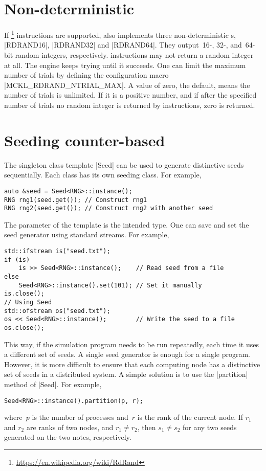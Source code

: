 \section{Non-deterministic \texorpdfstring{\rng}{RNG}}
\label{sec:Non-deterministic RNG}

If \rdrand\footnote{\url{https://en.wikipedia.org/wiki/RdRand}} instructions
are supported, \mckl also implements three non-deterministic \rng{}s,
|RDRAND16|, |RDRAND32| and |RDRAND64|. They output~16-, 32-, and~64-bit random
integers, respectively. \rdrand instructions may not return a random integer at
all. The \rng engine keeps trying until it succeeds. One can limit the maximum
number of trials by defining the configuration macro |MCKL_RDRAND_NTRIAL_MAX|.
A value of zero, the default, means the number of trials is unlimited. If it is
a positive number, and if after the specified number of trials no random
integer is returned by \rdrand instructions, zero is returned.

\section{Seeding counter-based \texorpdfstring{\rng}{RNG}}
\label{sec:Seeding counter-based RNG}

The singleton class template |Seed| can be used to generate distinctive seeds
sequentially. Each \rng class has its own seeding class. For example,
\begin{verbatim}
auto &seed = Seed<RNG>::instance();
RNG rng1(seed.get()); // Construct rng1
RNG rng2(seed.get()); // Construct rng2 with another seed
\end{verbatim}
The parameter of the template is the intended \rng type. One can save and set
the seed generator using standard streams. For example,
\begin{verbatim}
std::ifstream is("seed.txt");
if (is)
    is >> Seed<RNG>::instance();    // Read seed from a file
else
    Seed<RNG>::instance().set(101); // Set it manually
is.close();
// Using Seed
std::ofstream os("seed.txt");
os << Seed<RNG>::instance();        // Write the seed to a file
os.close();
\end{verbatim}
This way, if the simulation program needs to be run repeatedly, each time it
uses a different set of seeds. A single seed generator is enough for a single
program. However, it is more difficult to ensure that each computing node has a
distinctive set of seeds in a distributed system. A simple solution is to use
the |partition| method of |Seed|. For example,
\begin{verbatim}
Seed<RNG>::instance().partition(p, r);
\end{verbatim}
where~$p$ is the number of processes and~$r$ is the rank of the current node.
If $r_1$ and $r_2$ are ranks of two nodes, and $r_1 \ne r_2$, then $s_1 \ne
s_2$ for any two seeds generated on the two notes, respectively.

